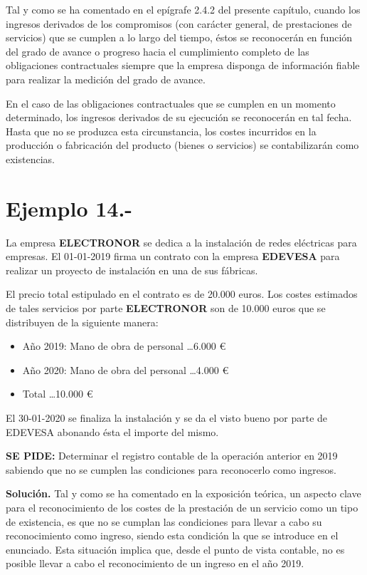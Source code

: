 \documentclass{article}
\begin{document}
Tal y como se ha comentado en el epígrafe 2.4.2 del presente capítulo, cuando los ingresos derivados de los compromisos (con carácter general, de prestaciones de servicios) que se cumplen a lo largo del tiempo, éstos se reconocerán en función del grado de avance o progreso hacia el cumplimiento completo de las obligaciones contractuales siempre que la empresa disponga de información fiable para realizar la medición del grado de avance.

En el caso de las obligaciones contractuales que se cumplen en un momento determinado, los ingresos derivados de su ejecución se reconocerán en tal fecha. Hasta que no se produzca esta circunstancia, los costes incurridos en la producción o fabricación del producto (bienes o servicios) se contabilizarán como existencias.

\section*{Ejemplo 14.-} La empresa \textbf{ELECTRONOR} se dedica a la instalación de redes eléctricas para empresas. El 01-01-2019 firma un contrato con la empresa \textbf{EDEVESA} para realizar un proyecto de instalación en una de sus fábricas.

El precio total estipulado en el contrato es de 20.000 euros. Los costes estimados de tales servicios por parte \textbf{ELECTRONOR} son de 10.000 euros que se distribuyen de la siguiente manera:

\begin{itemize}
    \item Año 2019: Mano de obra de personal \dots 6.000 €
    \item Año 2020: Mano de obra del personal \dots 4.000 €
    \item Total \dots 10.000 €
\end{itemize}

El 30-01-2020 se finaliza la instalación y se da el visto bueno por parte de EDEVESA abonando ésta el importe del mismo.

\textbf{SE PIDE:} Determinar el registro contable de la operación anterior en 2019 sabiendo que no se cumplen las condiciones para reconocerlo como ingresos.

\textbf{Solución.} Tal y como se ha comentado en la exposición teórica, un aspecto clave para el reconocimiento de los costes de la prestación de un servicio como un tipo de existencia, es que no se cumplan las condiciones para llevar a cabo su reconocimiento como ingreso, siendo esta condición la que se introduce en el enunciado. Esta situación implica que, desde el punto de vista contable, no es posible llevar a cabo el reconocimiento de un ingreso en el año 2019.
\end{document}
